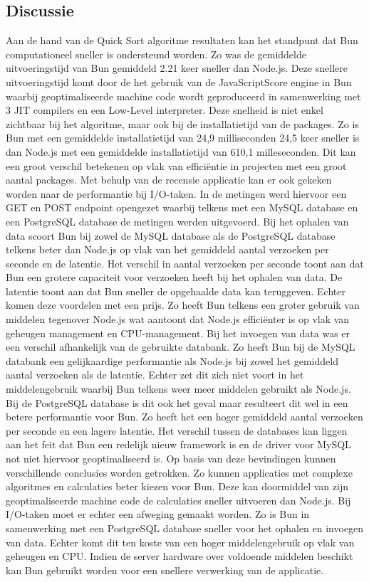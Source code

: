 \subsection{Discussie}
Aan de hand van de Quick Sort algoritme resultaten kan het standpunt dat Bun computationeel sneller is ondersteund worden.
Zo was de gemiddelde uitvoeringstijd van Bun gemiddeld 2.21 keer sneller dan Node.js. Deze snellere uitvoeringstijd komt door de
het gebruik van de JavaScriptScore engine in Bun waarbij geoptimaliseerde machine code wordt geproduceerd in 
samenwerking met 3 JIT compilers en een Low-Level interpreter.
Deze snelheid is niet enkel zichtbaar bij het algoritme, maar ook bij de installatietijd van de packages.
Zo is Bun met een gemiddelde installatietijd van 24,9 milliseconden 24,5 keer sneller is dan Node.js met een 
gemiddelde installatietijd van 610,1 milleseconden. Dit kan een groot verschil betekenen op vlak van efficiëntie in projecten 
met een groot aantal packages.
Met behulp van de recensie applicatie kan er ook gekeken worden naar de performantie bij I/O-taken.
In de metingen werd hiervoor een GET en POST endpoint opengezet waarbij telkens met een MySQL database en een PostgreSQL database de metingen werden uitgevoerd.
Bij het ophalen van data scoort Bun bij zowel de MySQL database als de PostgreSQL database telkens beter dan Node.js op vlak van het gemiddeld aantal verzoeken per seconde en de latentie.
Het verschil in aantal verzoeken per seconde toont aan dat Bun een grotere capaciteit voor verzoeken heeft bij het ophalen van data.
De latentie toont aan dat Bun sneller de opgehaalde data kan teruggeven. Echter komen deze voordelen met een prijs. 
Zo heeft Bun telkens een groter gebruik van middelen tegenover Node.js wat aantoont dat Node.js efficiënter is op vlak van geheugen management en CPU-management.
Bij het invoegen van data was er een verschil afhankelijk van de gebruikte databank. Zo heeft Bun bij de MySQL databank een gelijkaardige performantie
als Node.js bij zowel het gemiddeld aantal verzoeken als de latentie. 
Echter zet dit zich niet voort in het middelengebruik waarbij Bun telkens weer meer middelen gebruikt als Node.js.
Bij de PostgreSQL database is dit ook het geval maar resulteert dit wel in een betere performantie voor Bun. 
Zo heeft het een hoger gemiddeld aantal verzoeken per seconde en een lagere latentie.
Het verschil tussen de databases kan liggen aan het feit dat Bun een redelijk nieuw framework is 
en de driver voor MySQL not niet hiervoor geoptimaliseerd is.
Op basis van deze bevindingen kunnen verschillende conclusies worden getrokken. 
Zo kunnen applicaties met complexe algoritmes en calculaties beter kiezen voor Bun. 
Deze kan doormiddel van zijn geoptimaliseerde machine code de calculaties sneller uitvoeren dan Node.js.
Bij I/O-taken moet er echter een afweging gemaakt worden. Zo is Bun in samenwerking met een PostgreSQL database sneller voor het ophalen en invoegen van data.
Echter komt dit ten koste van een hoger middelengebruik op vlak van geheugen en CPU. 
Indien de server hardware over voldoende middelen beschikt kan Bun gebruikt worden voor een snellere verwerking van de applicatie.

